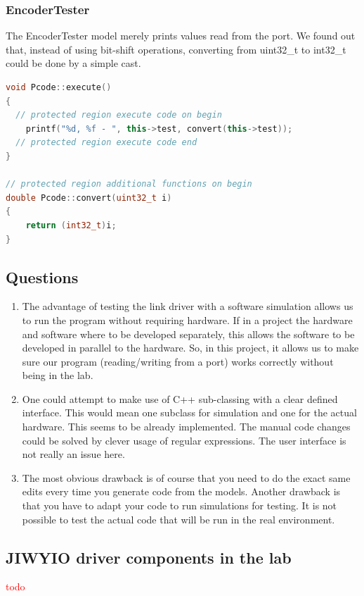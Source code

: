 \documentclass[a4paper,twoside,11pt]{article}
\newcommand{\todo}[1]{{\Large\sc\textcolor{red}{#1}}}
\begin{document}
\subsubsection{EncoderTester}
The EncoderTester model merely prints values read from the port. We found out 
that, instead of using bit-shift operations, converting from uint32\_t to int32\_t could be done by a simple cast. 
\begin{lstlisting}[caption=Relevant EncoderTester functions, label=code:enc, language=C++]
void Pcode::execute()
{
  // protected region execute code on begin
	printf("%d, %f - ", this->test, convert(this->test));
  // protected region execute code end
}

// protected region additional functions on begin
double Pcode::convert(uint32_t i)
{
	return (int32_t)i;
}
\end{lstlisting}

\subsection{Questions}
\begin{enumerate}
	\item The advantage of testing the link driver with a software simulation 
		allows us to run the program without requiring hardware.
		If in a project the hardware and software where to be developed 
		separately, this allows the software to be developed in parallel to the hardware.
		So, in this project, it allows us to make sure our program (reading/writing from a port) works correctly without being in the lab.
	\item One could attempt to make use of C++ sub-classing with a clear defined interface.
		This would mean one subclass for simulation and one for the actual hardware.
		This seems to be already implemented. The manual code changes could be solved by clever usage of regular expressions. The user interface is not really an issue here.
	\item The most obvious drawback is of course that you need to do the exact same edits every time you generate code from the models. Another drawback is that you have to adapt your code to run simulations for testing. It is not possible to test the actual code that will be run in the real environment.
\end{enumerate}

\subsection{JIWYIO driver components in the lab}
\todo{todo}
\end{document}
